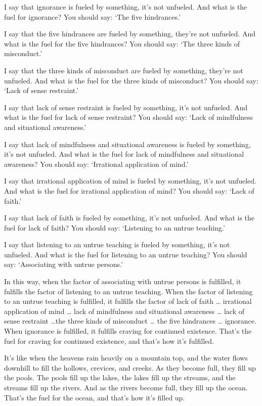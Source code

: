 \documentclass[12pt,openany]{book}%
\begin{document}
I say that ignorance is fueled by something, it’s not unfueled. And what is the fuel for ignorance? You should say: ‘The five hindrances.’ 

I say that the five hindrances are fueled by something, they’re not unfueled. And what is the fuel for the five hindrances? You should say: ‘The three kinds of misconduct.’ 

I say that the three kinds of misconduct are fueled by something, they’re not unfueled. And what is the fuel for the three kinds of misconduct? You should say: ‘Lack of sense restraint.’ 

I say that lack of sense restraint is fueled by something, it’s not unfueled. And what is the fuel for lack of sense restraint? You should say: ‘Lack of mindfulness and situational awareness.’ 

I say that lack of mindfulness and situational awareness is fueled by something, it’s not unfueled. And what is the fuel for lack of mindfulness and situational awareness? You should say: ‘Irrational application of mind.’ 

I say that irrational application of mind is fueled by something, it’s not unfueled. And what is the fuel for irrational application of mind? You should say: ‘Lack of faith.’ 

I say that lack of faith is fueled by something, it’s not unfueled. And what is the fuel for lack of faith? You should say: ‘Listening to an untrue teaching.’ 

I say that listening to an untrue teaching is fueled by something, it’s not unfueled. And what is the fuel for listening to an untrue teaching? You should say: ‘Associating with untrue persons.’ 

In this way, when the factor of associating with untrue persons is fulfilled, it fulfills the factor of listening to an untrue teaching. When the factor of listening to an untrue teaching is fulfilled, it fulfills the factor of lack of faith … irrational application of mind … lack of mindfulness and situational awareness … lack of sense restraint …the three kinds of misconduct … the five hindrances … ignorance. When ignorance is fulfilled, it fulfills craving for continued existence. That’s the fuel for craving for continued existence, and that’s how it’s fulfilled. 

It’s like when the heavens rain heavily on a mountain top, and the water flows downhill to fill the hollows, crevices, and creeks. As they become full, they fill up the pools. The pools fill up the lakes, the lakes fill up the streams, and the streams fill up the rivers. And as the rivers become full, they fill up the ocean. That’s the fuel for the ocean, and that’s how it’s filled up. 
\end{document}
